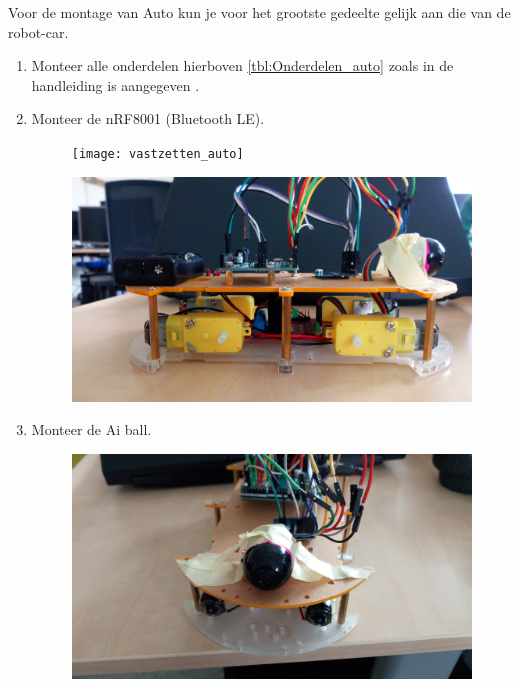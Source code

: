 \documentclass[12pt,a4paper]{article}
\begin{document}
	Voor de montage van Auto kun je voor het grootste gedeelte gelijk aan die van de robot-car. 
	\begin{enumerate}
		\item Monteer alle onderdelen hierboven \ref{tbl:Onderdelen_auto} zoals in de handleiding is aangegeven \cite{DIY_auto_hl}. 
		\item Monteer de nRF8001 (Bluetooth LE).
		\begin{figure}[H]
		\centering
		\texttt{[image: vastzetten\_auto]}
		\label{fig:vastzetten_auto}
		\end{figure}
		\begin{figure}[H]
			\centering
			\includegraphics[width=0.7\linewidth]{zijkant}
			\label{fig:vastzetten_zijkant_auto}
		\end{figure}
		\item Monteer de Ai ball.
		\begin{figure}[H]
			\centering
			\includegraphics[width=0.7\linewidth]{ai_ball}
			\label{fig:vastzetten_aiball}
		\end{figure}	
	\end{enumerate}
	
\end{document}
